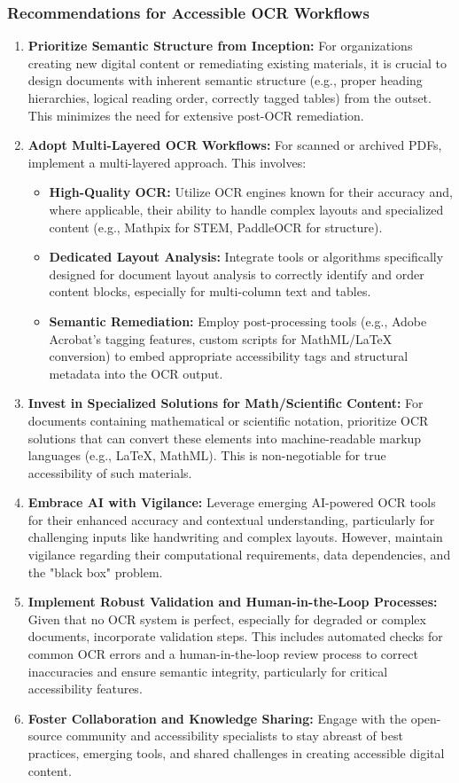 \subsubsection{Recommendations for Accessible OCR Workflows}

\begin{enumerate}
    \item \textbf{Prioritize Semantic Structure from Inception:} For organizations creating new digital content or remediating existing materials, it is crucial to design documents with inherent semantic structure (e.g., proper heading hierarchies, logical reading order, correctly tagged tables) from the outset. This minimizes the need for extensive post-OCR remediation.
    \item \textbf{Adopt Multi-Layered OCR Workflows:} For scanned or archived PDFs, implement a multi-layered approach. This involves:
    \begin{itemize}
        \item \textbf{High-Quality OCR:} Utilize OCR engines known for their accuracy and, where applicable, their ability to handle complex layouts and specialized content (e.g., Mathpix for STEM, PaddleOCR for structure).
        \item \textbf{Dedicated Layout Analysis:} Integrate tools or algorithms specifically designed for document layout analysis to correctly identify and order content blocks, especially for multi-column text and tables.
        \item \textbf{Semantic Remediation:} Employ post-processing tools (e.g., Adobe Acrobat's tagging features, custom scripts for MathML/LaTeX conversion) to embed appropriate accessibility tags and structural metadata into the OCR output.
    \end{itemize}
    \item \textbf{Invest in Specialized Solutions for Math/Scientific Content:} For documents containing mathematical or scientific notation, prioritize OCR solutions that can convert these elements into machine-readable markup languages (e.g., LaTeX, MathML). This is non-negotiable for true accessibility of such materials.
    \item \textbf{Embrace AI with Vigilance:} Leverage emerging AI-powered OCR tools for their enhanced accuracy and contextual understanding, particularly for challenging inputs like handwriting and complex layouts. However, maintain vigilance regarding their computational requirements, data dependencies, and the "black box" problem.
    \item \textbf{Implement Robust Validation and Human-in-the-Loop Processes:} Given that no OCR system is perfect, especially for degraded or complex documents, incorporate validation steps. This includes automated checks for common OCR errors and a human-in-the-loop review process to correct inaccuracies and ensure semantic integrity, particularly for critical accessibility features.
    \item \textbf{Foster Collaboration and Knowledge Sharing:} Engage with the open-source community and accessibility specialists to stay abreast of best practices, emerging tools, and shared challenges in creating accessible digital content.
\end{enumerate}

